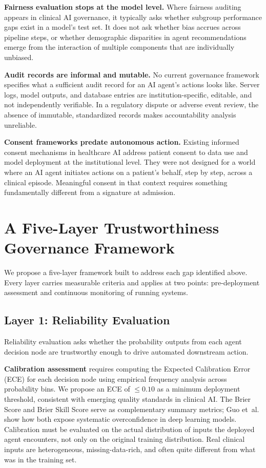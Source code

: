 \documentclass[12pt,a4paper]{article}
\begin{document}
\textbf{Fairness evaluation stops at the model level.}
Where fairness auditing appears in clinical AI governance, it
typically asks whether subgroup performance gaps exist in a
model's test set. It does not ask whether bias accrues across
pipeline steps, or whether demographic disparities in agent
recommendations emerge from the interaction of multiple
components that are individually unbiased.\cite{mittelstadt2016}

\textbf{Audit records are informal and mutable.}
No current governance framework specifies what a sufficient audit
record for an AI agent's actions looks like. Server logs, model
outputs, and database entries are institution-specific, editable,
and not independently verifiable. In a regulatory dispute or
adverse event review, the absence of immutable, standardized
records makes accountability analysis unreliable.

\textbf{Consent frameworks predate autonomous action.}
Existing informed consent mechanisms in healthcare AI address
patient consent to data use and model deployment at the
institutional level. They were not designed for a world where an
AI agent initiates actions on a patient's behalf, step by step,
across a clinical episode.\cite{mittelstadt2016} Meaningful
consent in that context requires something fundamentally different
from a signature at admission.

\section*{A Five-Layer Trustworthiness Governance Framework}

We propose a five-layer framework built to address each gap
identified above. Every layer carries measurable criteria and
applies at two points: pre-deployment assessment and continuous
monitoring of running systems.

\subsection*{Layer 1: Reliability Evaluation}

Reliability evaluation asks whether the probability outputs from
each agent decision node are trustworthy enough to drive automated
downstream action.

\textbf{Calibration assessment} requires computing the Expected
Calibration Error (ECE) for each decision node using empirical
frequency analysis across probability bins.\cite{guo2017}
We propose an ECE of $\leq 0.10$ as a minimum deployment
threshold, consistent with emerging quality standards in clinical
AI. The Brier Score and Brier Skill Score serve as complementary
summary metrics; Guo et~al.\cite{guo2017} show how both expose
systematic overconfidence in deep learning models. Calibration
must be evaluated on the actual distribution of inputs the
deployed agent encounters, not only on the original training
distribution. Real clinical inputs are heterogeneous,
missing-data-rich, and often quite different from what was in the
training set.
\end{document}
